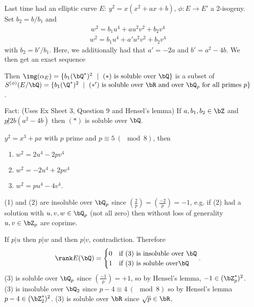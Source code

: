 Last time had an elliptic curve $E:~ y^2=x(x^2 + ax + b)$, $\phi:E \to E'$ a 2-isogeny. Set $b_2 = b/b_1$ and
\begin{align*}\tag{\ast}
	w^2 = b_1u^4 + au^2v^2 + b_2 v^4
\end{align*} 
\begin{align*}\tag{\ast'}
	w^2 = b_1u^4 + a'u^2v^2 + b_2 v^4
\end{align*}
with $b_2 = b'/b_1$. Here, we additionally had that $a' = -2a$ and $b' = a^2 - 4b$. We then get an exact sequence
\begin{center}
\end{center}
Then $\img(\alpha_E) = \{b_1(\bQ^*)^2 ~ \mid ~ (\ast) \text{ is soluble over } \bQ\}$ is a subset of $S^{(\phi)}(E/\bQ) = \{b_1(\Q^*)^2 ~\mid~ (\ast') \text{ is soluble over }\bR \text{ and over  } \bQ_p \text{ for all primes } p\}$. 

Fact: (Uses Ex Sheet 3, Question 9 and Hensel's lemma) If $a, b_1, b_2 \in \bZ$ and $p\not | 2b(a^2 - 4b)$ then $(\ast)$ is soluble over $\bQ$.

\begin{example}
	$y^2 = x^3 + px$ with $p$ prime and $p \equiv 5~ (\mod 8)$, then 
	\begin{enumerate}[(1)]
		\item $w^2 = 2u^4 - 2pv^4$
		\item $w^2 = -2u^4 + 2pv^4$
		\item $w^2 = pu^4 - 4v^4$.
	\end{enumerate}
	(1) and (2) are insoluble over $\bQ_p$ since $\left(\frac{2}{p}\right) = \left(\frac{-2}{p}\right) = -1$, e.g. if (2) had a solution with $u,v,w \in \bQ_p$ (not all zero) then without loss of generality $u,v \in \bZ_p$ are coprime.

	If $p | u$ then $p | w$ and then $p | v$, contradiction. Therefore
	\begin{align*}
		\rank E(\bQ) =
		\begin{cases}
			0 & \text{if (3) is insoluble over } \bQ \\
			1 & \text{if (3) is soluble over} \bQ
		\end{cases}.
	\end{align*}
	(3) is soluble over $\bQ_p$ since $\left(\frac{-1}{p}\right) = + 1$, so by Hensel's lemma, $-1 \in (\bZ_p^*)^2$. (3) is insoluble over $\bQ_2$ since $p - 4 \equiv 4 ~ (\mod 8)$ so by Hensel's lemma $p - 4 \in (\bZ_2^*)^2$. (3) is soluble over $\bR$ since $\sqrt{p} \in \bR$.
\end{example}

